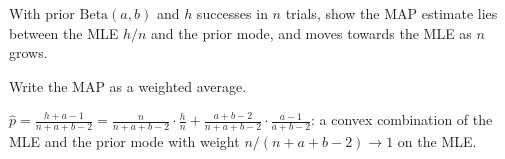 \begin{problem}\twochili
	With prior $\mathrm{Beta}(a,b)$ and $h$ successes in $n$ trials, show the MAP estimate lies between the MLE $h/n$ and
	the prior mode, and moves towards the MLE as $n$ grows.
	\begin{hint}Write the MAP as a weighted average.\end{hint}
	\begin{sol}$\hat p=\frac{h+a-1}{n+a+b-2}=\frac{n}{n+a+b-2}\cdot\frac hn+\frac{a+b-2}{n+a+b-2}\cdot\frac{a-1}{a+b-2}$:
		a convex combination of the MLE and the prior mode with weight $n/(n+a+b-2)\to1$ on the MLE.\end{sol}
\end{problem}
